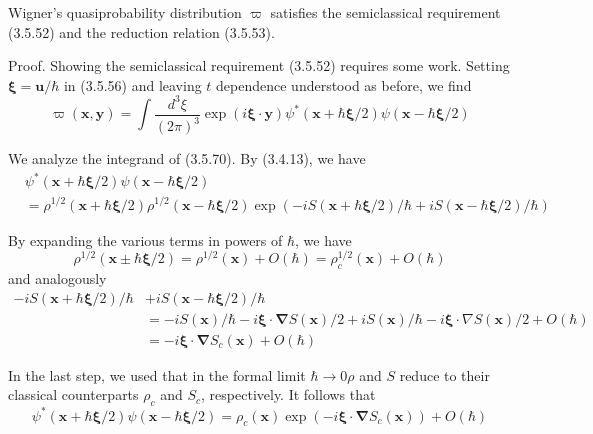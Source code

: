 \documentclass{article}
\begin{document}
Wigner's quasiprobability distribution $\varpi$ satisfies the semiclassical requirement (3.5.52) and the reduction relation (3.5.53).

Proof. Showing the semiclassical requirement (3.5.52) requires some work. Setting $\boldsymbol{\xi}=\boldsymbol{u} / \hbar$ in (3.5.56) and leaving $t$ dependence understood as before, we find
$$
\begin{equation*}
\varpi(\boldsymbol{x}, \boldsymbol{y})=\int \frac{d^{3} \xi}{(2 \pi)^{3}} \exp (i \boldsymbol{\xi} \cdot \boldsymbol{y}) \psi^{*}(\boldsymbol{x}+\hbar \boldsymbol{\xi} / 2) \psi(\boldsymbol{x}-\hbar \boldsymbol{\xi} / 2) \tag{3.5.70}
\end{equation*}
$$

We analyze the integrand of (3.5.70). By (3.4.13), we have
$$
\begin{align*}
& \psi^{*}(\boldsymbol{x}+\hbar \boldsymbol{\xi} / 2) \psi(\boldsymbol{x}-\hbar \boldsymbol{\xi} / 2)  \tag{3.5.71}\\
&=\rho^{1 / 2}(\boldsymbol{x}+\hbar \boldsymbol{\xi} / 2) \rho^{1 / 2}(\boldsymbol{x}-\hbar \boldsymbol{\xi} / 2) \exp (-i S(\boldsymbol{x}+\hbar \boldsymbol{\xi} / 2) / \hbar+i S(\boldsymbol{x}-\hbar \boldsymbol{\xi} / 2) / \hbar)
\end{align*}
$$

By expanding the various terms in powers of $\hbar$, we have
$$
\begin{equation*}
\rho^{1 / 2}(\boldsymbol{x} \pm \hbar \boldsymbol{\xi} / 2)=\rho^{1 / 2}(\boldsymbol{x})+O(\hbar)=\rho_{c}^{1 / 2}(\boldsymbol{x})+O(\hbar) \tag{3.5.72}
\end{equation*}
$$
and analogously
$$
\begin{align*}
-i S(\boldsymbol{x}+\hbar \boldsymbol{\xi} / 2) / \hbar & +i S(\boldsymbol{x}-\hbar \boldsymbol{\xi} / 2) / \hbar  \tag{3.5.73}\\
& =-i S(\boldsymbol{x}) / \hbar-i \boldsymbol{\xi} \cdot \boldsymbol{\nabla} S(\boldsymbol{x}) / 2+i S(\boldsymbol{x}) / \hbar-i \boldsymbol{\xi} \cdot \nabla S(\boldsymbol{x}) / 2+O(\hbar) \\
& =-i \boldsymbol{\xi} \cdot \boldsymbol{\nabla} S_{c}(\boldsymbol{x})+O(\hbar)
\end{align*}
$$

In the last step, we used that in the formal limit $\hbar \rightarrow 0 \rho$ and $S$ reduce to their classical counterparts $\rho_{c}$ and $S_{c}$, respectively. It follows that
$$
\begin{equation*}
\psi^{*}(\boldsymbol{x}+\hbar \boldsymbol{\xi} / 2) \psi(\boldsymbol{x}-\hbar \boldsymbol{\xi} / 2)=\rho_{c}(\boldsymbol{x}) \exp \left(-i \boldsymbol{\xi} \cdot \boldsymbol{\nabla} S_{c}(\boldsymbol{x})\right)+O(\hbar) \tag{3.5.74}
\end{equation*}
$$
\end{document}
